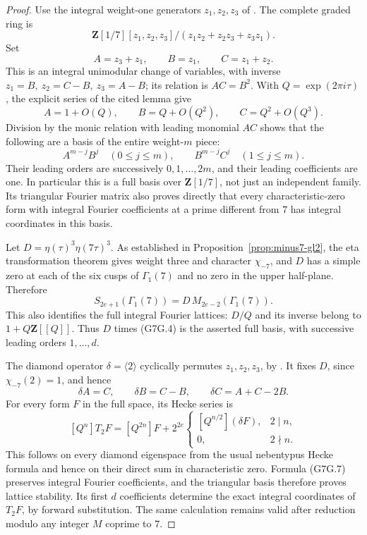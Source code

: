 \documentclass[11pt,a4paper]{article}
\theoremstyle{definition}
\begin{document}
\begin{proof}
Use the integral weight-one generators \(z_1,z_2,z_3\) of
\cite[Lemma~2.3 and Proposition~2.4, pp.~9--11]{K17MeierOzornova2020}.
The complete graded ring is
\[
 \mathbf Z[1/7][z_1,z_2,z_3]/
       (z_1z_2+z_2z_3+z_3z_1).
 \tag{G7G.2}
\]
Set
\[
 A=z_3+z_1,\qquad B=z_1,\qquad C=z_1+z_2.
\]
This is an integral unimodular change of variables, with inverse
\(z_1=B,\ z_2=C-B,\ z_3=A-B\); its relation is \(AC=B^2\).
With \(Q=\exp(2\pi i\tau)\), the explicit series of the cited lemma give
\[
 A=1+O(Q),\qquad B=Q+O(Q^2),\qquad C=Q^2+O(Q^3).
 \tag{G7G.3}
\]
Division by the monic relation with leading monomial \(AC\)
shows that the following are a basis of the entire weight-\(m\)
piece:
\[
 A^{m-j}B^j\quad(0\le j\le m),\qquad
 B^{m-j}C^j\quad(1\le j\le m).
 \tag{G7G.4}
\]
Their leading orders are successively \(0,1,\ldots,2m\), and
their leading coefficients are one. In particular this is a
full basis over \(\mathbf Z[1/7]\), not just an independent family.
Its triangular Fourier matrix also proves directly that every
characteristic-zero form with integral Fourier coefficients at a
prime different from \(7\) has integral coordinates in this basis.

Let \(D=\eta(\tau)^3\eta(7\tau)^3\).
As established in Proposition~\ref{prop:minus7-gl2}, the eta
transformation theorem
\cite[Theorem~1.1, Remark~1.2 and Proposition~3.1]{K17SavittNewman}
gives weight three and character \(\chi_{-7}\), and \(D\) has
a simple zero at each of the six cusps of \(\Gamma_1(7)\)
and no zero in the upper half-plane. Therefore
\[
 S_{2e+1}(\Gamma_1(7))=D\,M_{2e-2}(\Gamma_1(7)).
 \tag{G7G.5}
\]
This also identifies the full integral Fourier lattices:
\(D/Q\) and its inverse belong to \(1+Q\mathbf Z[[Q]]\).
Thus \(D\) times (G7G.4) is the asserted full basis, with
successive leading orders \(1,\ldots,d\).

The diamond operator \(\delta=\langle2\rangle\) cyclically
permutes \(z_1,z_2,z_3\), by
\cite[Lemma~2.6, p.~11]{K17MeierOzornova2020}.
It fixes \(D\), since \(\chi_{-7}(2)=1\), and hence
\[
 \delta A=C,\qquad
 \delta B=C-B,\qquad
 \delta C=A+C-2B.
 \tag{G7G.6}
\]
For every form \(F\) in the full space, its Hecke series is
\[
 [Q^n]T_2F=[Q^{2n}]F+
  2^{2e}\begin{cases}[Q^{n/2}](\delta F),&2\mid n,\\0,&2\nmid n.\end{cases}
 \tag{G7G.7}
\]
This follows on every diamond eigenspace from the usual
nebentypus Hecke formula and hence on their direct sum in
characteristic zero. Formula (G7G.7) preserves integral Fourier
coefficients, and the triangular basis therefore proves lattice
stability. Its first \(d\) coefficients determine the exact
integral coordinates of \(T_2F\), by forward substitution.
The same calculation remains valid after reduction modulo any
integer \(M\) coprime to \(7\).


\end{proof}
\end{document}
